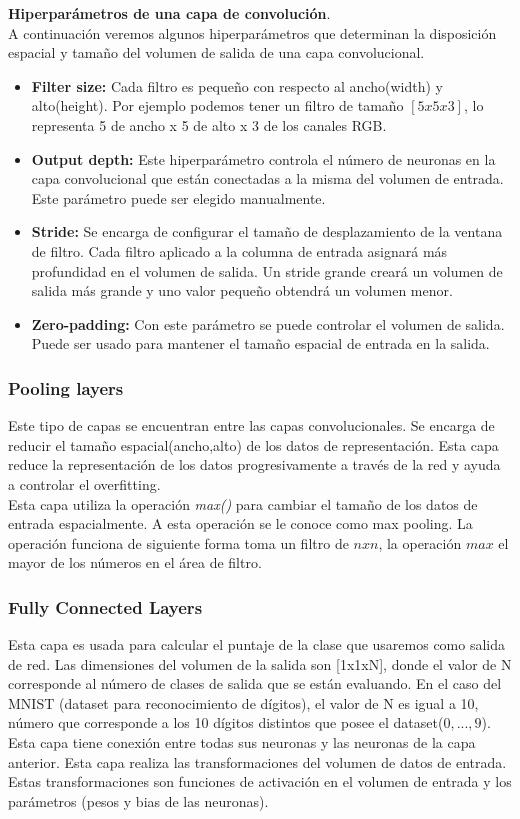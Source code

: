 \textbf{Hiperparámetros de una capa de convolución}.\\
A continuación veremos algunos hiperparámetros que determinan la disposición espacial y tamaño del volumen de salida de una capa convolucional.
\begin{itemize}
	\item \textbf{Filter size:} Cada filtro es pequeño con respecto al ancho(width) y alto(height). Por ejemplo podemos tener un filtro de tamaño $[5x5x3]$, lo representa 5 de ancho x 5 de alto x 3 de los canales RGB.
	\item \textbf{Output depth:} Este hiperparámetro controla el número de neuronas en la capa convolucional que están conectadas a la misma del volumen de entrada. Este parámetro puede ser elegido manualmente.
	\item \textbf{Stride:} Se encarga de configurar el tamaño de desplazamiento de la ventana de filtro. Cada filtro aplicado a la columna de entrada asignará más profundidad en el volumen de salida. Un stride grande creará un volumen de salida más grande y uno valor pequeño obtendrá un volumen menor.
	\item \textbf{Zero-padding:} Con este parámetro se puede controlar el volumen de salida. Puede ser usado para mantener el tamaño espacial de entrada en la salida.
\end{itemize}

\subsubsection{Pooling layers}
Este tipo de capas se encuentran entre las capas convolucionales. Se encarga de reducir el tamaño espacial(ancho,alto) de los datos de representación. Esta capa reduce la representación de los datos progresivamente a través de la red y ayuda a controlar el overfitting.\\
Esta capa utiliza la operación \textit{max()} para cambiar el tamaño de los datos de entrada espacialmente. A esta operación se le conoce como max pooling. La operación funciona de siguiente forma toma un filtro de $n x n$, la operación $max$ el mayor de los números en el área de filtro.

\subsubsection{Fully Connected Layers}

Esta capa es usada para calcular el puntaje de la clase que usaremos como salida de red. Las dimensiones del volumen de la salida son [1x1xN], donde el valor de N corresponde al número de clases de salida que se están evaluando. En el caso del MNIST (dataset para reconocimiento de dígitos), el valor de N es igual a 10, número que corresponde a los 10 dígitos distintos que posee el dataset($0, ... ,9$).\\
Esta capa tiene conexión entre todas sus neuronas y las neuronas de la capa anterior. Esta capa realiza las transformaciones del volumen de datos de entrada. Estas transformaciones son funciones de activación en el volumen de entrada y los parámetros (pesos y bias de las neuronas).
